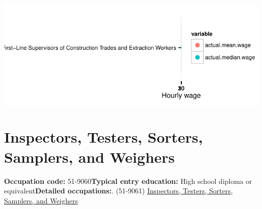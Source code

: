 \documentclass[a4paper,10pt]{article}\usepackage[]{graphicx}\usepackage[]{color}
\makeatletter
\def\maxwidth{ %
  \ifdim\Gin@nat@width>\linewidth
    \linewidth
  \else
    \Gin@nat@width
  \fi
}
\makeatother
\begin{document}
{\centering \includegraphics[width=\maxwidth]{figure/unnamed-chunk-274} 

}


\newpage\section{Inspectors, Testers, Sorters, Samplers, and Weighers}\textbf{Occupation code:} 51-9060\newline\textbf{Typical entry education:} High school diploma or equivalent\newline\textbf{Detailed occupations:}. (51-9061)  \href{http://www.bls.gov/oes/current/oes519061.htm}{Inspectors, Testers, Sorters, Samplers, and Weighers}\newline%
\end{document}
